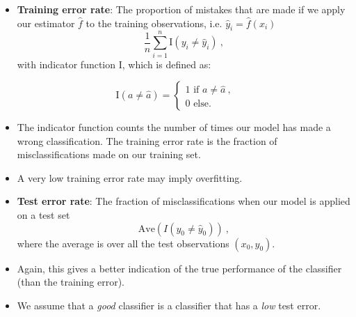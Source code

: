 \documentclass[ignorenonframetext,]{beamer}
\providecommand{\tightlist}{%
  \setlength{\itemsep}{0pt}\setlength{\parskip}{0pt}}
\begin{document}
\begin{frame}

\begin{itemize}
\tightlist
\item
  \textbf{Training error rate}: The proportion of mistakes that are made
  if we apply our estimator \(\hat{f}\) to the training observations,
  i.e. \(\hat{y}_i=\hat{f}(x_i)\)
  \[\frac{1}{n}\sum_{i=1}^n \text{I}(y_i \neq \hat{y}_i) \ ,\] with
  indicator function I, which is defined as:
\end{itemize}

\[\text{I}(a\neq\hat{a}) = \begin{cases} 1 \text{ if } a \neq \hat{a} \ , \\ 
0 \text{ else. } \end{cases}\]

\begin{itemize}
\item
  The indicator function counts the number of times our model has made a
  wrong classification. The training error rate is the fraction of
  misclassifications made on our training set.
\item
  A very low training error rate may imply overfitting.
\end{itemize}

\end{frame}

\begin{frame}

\begin{itemize}
\item
  \textbf{Test error rate}: The fraction of misclassifications when our
  model is applied on a test set
  \[\text{Ave}(I(y_0\neq \hat{y}_0)) \ ,\] where the average is over all
  the test observations \((x_0,y_0)\).
\item
  Again, this gives a better indication of the true performance of the
  classifier (than the training error).
\item
  We assume that a \emph{good} classifier is a classifier that has a
  \emph{low} test error.
\end{itemize}

\end{frame}
\end{document}
